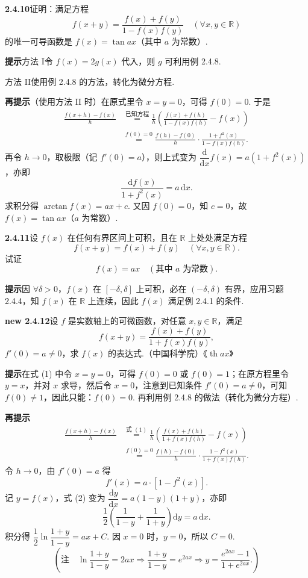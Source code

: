 \documentclass[UTF8, 12pt, fontset=fandol, oneside]{ctexart}
\begin{document}
\noindent\textbf{2.4.10}\quad 证明：满足方程
\[
  f(x+y)=\frac{f(x)+f(y)}{1-f(x)f(y)}\quad(\forall x,y\in\mathbb{R})
\]
的唯一可导函数是 $f(x)=\tan ax$（其中 $a$ 为常数）.

\noindent\textbf{提示}\quad 方法 I\quad 令 $f(x)=2g(x)$ 代入，则 $g$ 可利用例 2.4.8.

方法 II\quad 使用例 2.4.8 的方法，转化为微分方程.

\noindent\textbf{再提示}\quad （使用方法 II 时）在原式里令 $x=y=0$，可得 $f(0)=0$. 于是
\[
\begin{aligned}
\frac{f(x+h)-f(x)}{h}
&\overset{\text{已知方程}}{=}\frac1h\left(\frac{f(x)+f(h)}{1-f(x)f(h)}-f(x)\right)\\
&\overset{f(0)=0}{=}\frac{f(h)-f(0)}{h}\cdot\frac{1+f^2(x)}{1-f(x)f(h)}.
\end{aligned}
\]
再令 $h\to0$，取极限（记 $f'(0)=a$），则上式变为 $\dfrac{\mathrm{d}}{\mathrm{d}x}f(x)=a(1+f^2(x))$，亦即
\[
  \frac{\mathrm{d}f(x)}{1+f^2(x)}=a\,\mathrm{d}x.
\]
求积分得 $\arctan f(x)=ax+c$. 又因 $f(0)=0$，知 $c=0$，故 $f(x)=\tan ax$（$a$ 为常数）.

\noindent\textbf{2.4.11}\quad 设 $f(x)$ 在任何有界区间上可积，且在 $\mathbb{R}$ 上处处满足方程
\[
  f(x+y)=f(x)+f(y)\quad(\forall x,y\in\mathbb{R}).
\]
试证
\[
  f(x)=ax\quad(\text{其中 }a\text{ 为常数}).
\]

\noindent\textbf{提示}\quad 因 $\forall\delta>0$，$f(x)$ 在 $[-\delta,\delta]$ 上可积，必在 $(-\delta,\delta)$ 有界，应用习题 2.4.4，知 $f(x)$ 在 $\mathbb{R}$ 上连续，因此 $f(x)$ 满足例 2.4.1 的条件.

\noindent\textbf{new 2.4.12}\quad 设 $f$ 是实数轴上的可微函数，对任意 $x,y\in\mathbb{R}$，满足
\[
  f(x+y)=\frac{f(x)+f(y)}{1+f(x)f(y)}, \tag{1}
\]
$f'(0)=a\ne0$，求 $f(x)$ 的表达式.（中国科学院）\hfill《$\operatorname{th} ax$》

\noindent\textbf{提示}\quad 在式 (1) 中令 $x=y=0$，可得 $f(0)=0$ 或 $f(0)=1$；在原方程里令 $y=x$，并对 $x$ 求导，然后令 $x=0$，注意到已知条件 $f'(0)=a\ne0$，可知 $f(0)\ne1$，因此只能：$f(0)=0$. 再利用例 2.4.8 的做法（转化为微分方程）.

\noindent\textbf{再提示}\quad
\[
\begin{aligned}
\frac{f(x+h)-f(x)}{h}
&\overset{\text{式 }(1)}{=}\frac1h\left(\frac{f(x)+f(h)}{1+f(x)f(h)}-f(x)\right)\\
&\overset{f(0)=0}{=}\frac{f(h)-f(0)}{h}\cdot\frac{1-f^2(x)}{1+f(x)f(h)}.
\end{aligned}
\]
令 $h\to0$，由 $f'(0)=a$ 得
\[
  f'(x)=a\cdot[1-f^2(x)]. \tag{2}
\]
记 $y=f(x)$，式 (2) 变为 $\dfrac{\mathrm{d}y}{\mathrm{d}x}=a(1-y)(1+y)$，亦即
\[
  \frac12\left(\frac1{1-y}+\frac1{1+y}\right)\mathrm{d}y=a\,\mathrm{d}x.
\]
积分得 $\dfrac12\ln\dfrac{1+y}{1-y}=ax+C$. 因 $x=0$ 时，$y=0$，所以 $C=0$.
\[
  \left(\text{注}\quad \ln\frac{1+y}{1-y}=2ax\Rightarrow\frac{1+y}{1-y}=e^{2ax}\Rightarrow y=\frac{e^{2ax}-1}{1+e^{2ax}}.\right)
\]
\end{document}
